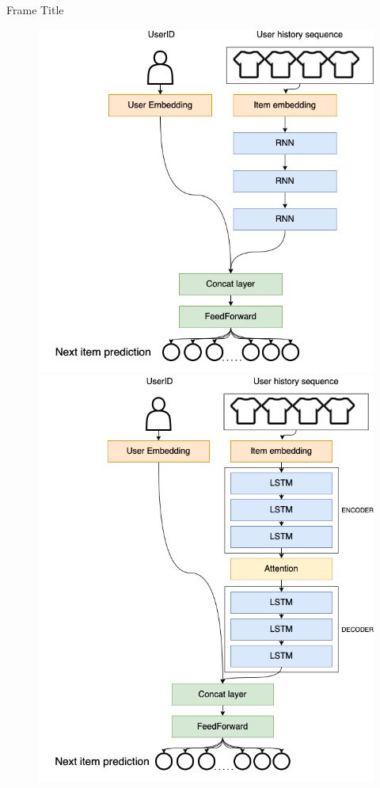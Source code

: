 \documentclass{beamer}
\begin{document}
\begin{frame}{Frame Title}
\begin{figure}[!htb]
  \includegraphics[width=\linewidth]{images/models/RNN.png}
\endminipage\hfill
{}
  \includegraphics[width=\linewidth]{images/models/Attention.png}

\end{figure}
\end{frame}
\end{document}

